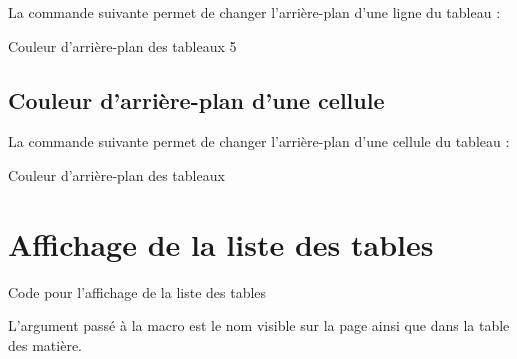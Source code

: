 La commande suivante permet de changer l'arrière-plan d'une ligne du tableau :

\begin{Latex}{Couleur d'arrière-plan des tableaux}
 5
\end{Latex}

\subsection{Couleur d'arrière-plan d'une cellule}


La commande suivante permet de changer l'arrière-plan d'une cellule du tableau :

\begin{Latex}{Couleur d'arrière-plan des tableaux}
\end{Latex}


\section{Affichage de la liste des tables}


\begin{Latex}{Code pour l'affichage de la liste des tables}
\end{Latex}

L'argument passé à la macro est le nom visible sur la page ainsi que dans la table des matière.



